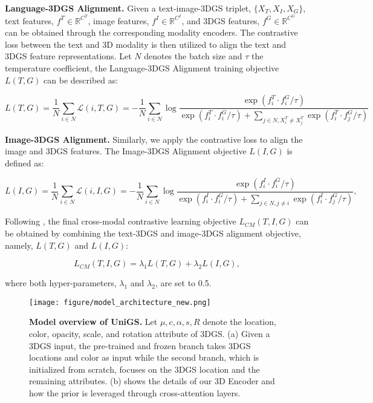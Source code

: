 \noindent\textbf{Language-3DGS Alignment.} 
Given a text-image-3DGS triplet, $\{X_T, X_I, X_G\}$, text features, $f^T\in\mathbb{R}^{C^T}$, image features, $f^I\in\mathbb{R}^{C^I}$, and 3DGS features, $f^G\in\mathbb{R}^{C^G}$ can be obtained through the corresponding modality encoders. The contrastive loss between the text and 3D modality is then utilized to align the text and 3DGS feature representations. Let $N$ denotes the batch size and $\tau$ the temperature coefficient, the Language-3DGS Alignment training objective $L(T,G)$ can be described as: 

\begin{equation}
    \label{eq:text-3dgs-loss}
    L(T,G) = \frac{1}{N}\underset{i\in N}{\sum}\mathcal{L}(i,T,G)=
     -\frac{1}{N}\underset{i\in N}{\sum}\log \frac{\exp(f_{i}^{T}\cdot f^{G}_{i}/\tau)}{\exp(f_{i}^{T}\cdot f^{G}_{i}/\tau)+\underset{j\in N,X_{i}^{T}\neq X_{j}^{T}}{\sum}\exp(f_{i}^{T}\cdot f^{G}_{j}/\tau)}
\end{equation}

\noindent\textbf{Image-3DGS Alignment.} Similarly, we apply the contrastive loss to align the image and 3DGS features. The Image-3DGS Alignment objective $L(I,G)$ is defined as:

\begin{equation}
    \label{eq:image-3dgs-loss}
    L(I,G) = \frac{1}{N}\underset{i\in N}{\sum}\mathcal{L}(i,I,G)= -\frac{1}{N}\underset{i\in N}{\sum}\log \frac{\exp(f_{i}^{I}\cdot f^{G}_{i}/\tau)}{\exp(f_{i}^{I}\cdot f^{G}_{i}/\tau)+\underset{j\in N,j\neq i}{\sum}\exp(f_{i}^{I}\cdot f^{G}_{j}/\tau)},
\end{equation}

Following \citep{zeng2023clip2}, the final cross-modal contrastive learning objective $L_{CM}(T,I,G)$ can be obtained by combining the text-3DGS and image-3DGS alignment objective, namely, $L(T,G)$ and $L(I,G)$:

\begin{equation}
    \label{eq:main-loss}
    L_{CM}(T,I,G) = \lambda_1 L(T,G) + \lambda_2 L(I,G),
\end{equation}

where both hyper-parameters, $\lambda_1$ and $\lambda_2$, are set to 0.5.


\begin{figure*}%
    \centerline{\texttt{[image: figure/model\_architecture\_new.png]}}
    \caption{\textbf{Model overview of UniGS.} Let $\mu, c, \alpha, s, R$ denote the location, color, opacity, scale, and rotation attribute of 3DGS. (a) Given a 3DGS input, the pre-trained and frozen branch takes 3DGS locations and color as input while the second branch, which is initialized from scratch, focuses on the 3DGS location and the remaining attributes. (b) shows the details of our 3D Encoder and how the prior is leveraged through cross-attention layers.}
    \vspace{-3mm}
    \label{fig:model_overview}
\end{figure*}

